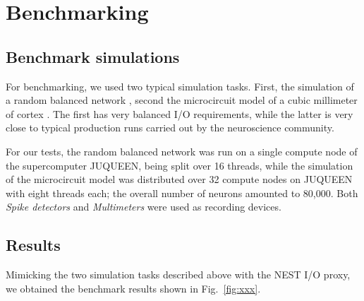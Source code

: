 \documentclass[]{YIC2015}
\begin{document}
\section{Benchmarking}

\subsection{Benchmark simulations}\label{sect:use_cases}

For benchmarking, we used two typical simulation tasks. First, the
simulation of a random balanced network \cite{morrison07}, second the
microcircuit model of a cubic millimeter of cortex \cite{potjans14}.
The first has very balanced I/O requirements, while the latter is very
close to typical production runs carried out by the neuroscience
community.

For our tests, the random balanced network was run on a single compute
node of the supercomputer JUQUEEN, being split over 16 threads, while
the simulation of the microcircuit model was distributed over 32
compute nodes on JUQUEEN with eight threads each; the overall number
of neurons amounted to 80,000. Both \emph{Spike detectors} and \emph{Multimeters}
were used as recording devices.

\subsection{Results}


Mimicking the two simulation tasks described above with the NEST I/O proxy, we obtained
the benchmark results shown in Fig.~\ref{fig:xxx}.

\end{document}
